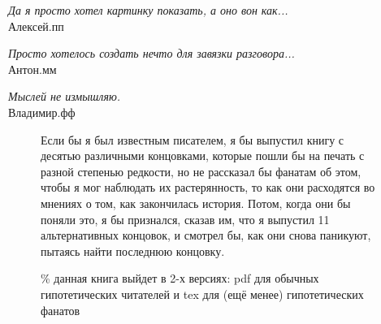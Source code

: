 
\begin{flushright}
\emph{Да я просто хотел картинку показать, а оно вон как...}\\
    Алексей.пп %
\end{flushright}
\vspace{1cm}
\begin{flushright}
\emph{Просто хотелось создать нечто для завязки разговора...}\\
Антон.мм %
\end{flushright}
\vspace{1cm}
\begin{flushright}
\emph{Мыслей не измышляю.}\\
Владимир.фф %
\end{flushright}
\vspace{1.5cm}
\begin{figure}[ht!]
    \Large
    Если бы я был известным писателем, я бы выпустил книгу с десятью различными концовками, которые пошли бы на печать с разной степенью редкости, но не рассказал бы фанатам об этом, чтобы я мог наблюдать их растерянность, то как они расходятся во мнениях о том, как закончилась история. Потом, когда они бы поняли это, я бы признался, сказав им, что я выпустил 11 альтернативных концовок, и смотрел бы, как они снова паникуют, пытаясь найти последнюю концовку.
    \caption{\% данная книга выйдет в 2-х версиях: pdf для обычных гипотетических читателей и tex для (ещё менее) гипотетических фанатов}
\end{figure}
